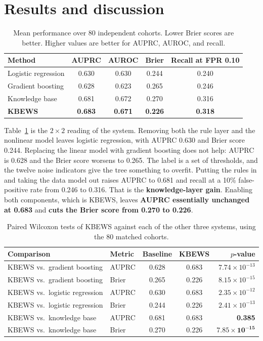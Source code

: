 \documentclass[preprint,12pt]{elsarticle}
\begin{document}
\section{Results and discussion}
\label{sec:results}

\begin{table}[H]
\caption{Mean performance over 80 independent cohorts. Lower Brier scores are better. Higher values are better for AUPRC, AUROC, and recall.}
\label{tab:means}
\centering
\begin{tabular}{@{}lcccc@{}}
\toprule
Method & AUPRC & AUROC & Brier & Recall at FPR 0.10 \\
\midrule
Logistic regression & 0.630 & 0.630 & 0.244 & 0.240 \\
Gradient boosting & 0.628 & 0.623 & 0.265 & 0.246 \\
Knowledge base & 0.681 & 0.672 & 0.270 & 0.316 \\
\textbf{KBEWS} & \textbf{0.683} & \textbf{0.671} & \textbf{0.226} & \textbf{0.318} \\
\bottomrule
\end{tabular}
\end{table}

Table~\ref{tab:means} is the $2\times2$ reading of the system. Removing both the rule layer and the nonlinear model leaves logistic regression, with AUPRC 0.630 and Brier score 0.244. Replacing the linear model with gradient boosting does not help: AUPRC is 0.628 and the Brier score worsens to 0.265. The label is a set of thresholds, and the twelve noise indicators give the tree something to overfit. Putting the rules in and taking the data model out raises AUPRC to 0.681 and recall at a 10\% false-positive rate from 0.246 to 0.316. That is the \textbf{knowledge-layer gain}. Enabling both components, which is KBEWS, leaves \textbf{AUPRC essentially unchanged at 0.683} and \textbf{cuts the Brier score from 0.270 to 0.226}.

\begin{table}[H]
\caption{Paired Wilcoxon tests of KBEWS against each of the other three systems, using the 80 matched cohorts.}
\label{tab:tests}
\centering
\small
\setlength{\tabcolsep}{4pt}
\begin{tabular}{@{}llccr@{}}
\toprule
Comparison & Metric & Baseline & KBEWS & $p$-value \\
\midrule
KBEWS vs.\ gradient boosting & AUPRC & 0.628 & 0.683 & $7.74\times10^{-13}$ \\
KBEWS vs.\ gradient boosting & Brier & 0.265 & 0.226 & $8.15\times10^{-15}$ \\
KBEWS vs.\ logistic regression & AUPRC & 0.630 & 0.683 & $2.35\times10^{-12}$ \\
KBEWS vs.\ logistic regression & Brier & 0.244 & 0.226 & $2.41\times10^{-13}$ \\
KBEWS vs.\ knowledge base & AUPRC & 0.681 & 0.683 & \textbf{0.385} \\
KBEWS vs.\ knowledge base & Brier & 0.270 & 0.226 & $\mathbf{7.85\times10^{-15}}$ \\
\bottomrule
\end{tabular}
\end{table}
\end{document}

